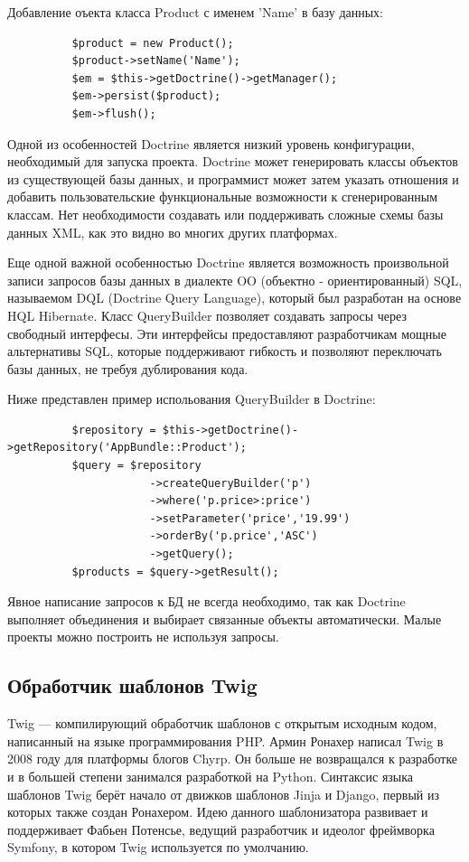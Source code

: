 Добавление оъекта класса Product с именем 'Name' в базу данных:
\begin{lstlisting}
          $product = new Product();
          $product->setName('Name');
          $em = $this->getDoctrine()->getManager();
          $em->persist($product);
          $em->flush();
\end{lstlisting}

Одной из особенностей Doctrine является низкий уровень конфигурации, необходимый для запуска проекта. Doctrine может генерировать классы объектов из существующей базы данных, и программист может затем указать отношения и добавить пользовательские функциональные возможности к сгенерированным классам. Нет необходимости создавать или поддерживать сложные схемы базы данных XML, как это видно во многих других платформах.

Еще одной важной особенностью Doctrine является возможность произвольной записи запросов базы данных в диалекте OO (объектно - ориентированный) SQL, называемом DQL (Doctrine Query Language), который был разработан на основе  HQL Hibernate. Класс QueryBuilder позволяет создавать запросы через свободный интерфесы. Эти интерфейсы предоставляют разработчикам мощные альтернативы SQL, которые поддерживают гибкость и позволяют переключать базы данных, не требуя дублирования кода.

Ниже представлен пример испольования QueryBuilder в Doctrine:
\begin{lstlisting}
          $repository = $this->getDoctrine()->getRepository('AppBundle::Product');
          $query = $repository
                      ->createQueryBuilder('p')
                      ->where('p.price>:price')
                      ->setParameter('price','19.99')
                      ->orderBy('p.price','ASC')
                      ->getQuery();
          $products = $query->getResult();
\end{lstlisting}

Явное написание запросов к БД не всегда необходимо, так как Doctrine выполняет объединения и выбирает связанные объекты автоматически. Малые проекты можно построить не используя запросы.

\subsection{Обработчик шаблонов Twig}

Twig — компилирующий обработчик шаблонов с открытым исходным кодом, написанный на языке программирования PHP. Армин Ронахер написал Twig в 2008 году для платформы блогов Chyrp. Он больше не возвращался к разработке и в большей степени занимался разработкой на Python. Синтаксис языка шаблонов Twig берёт начало от движков шаблонов Jinja и Django, первый из которых также создан Ронахером. Идею данного шаблонизатора развивает и поддерживает Фабьен Потенсье, ведущий разработчик и идеолог фреймворка Symfony, в котором Twig используется по умолчанию.

